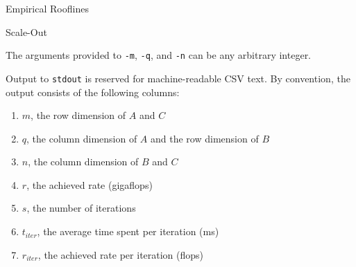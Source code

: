\documentclass{article}
\begin{document}
\begin{section}{Empirical Rooflines}
\begin{subsection}{Scale-Out}
    \begin{paragraph}{}
      The arguments provided to \texttt{-m}, \texttt{-q}, and \texttt{-n} can be any arbitrary integer.
    \end{paragraph}
    \begin{paragraph}{}
      Output to \texttt{stdout} is reserved for machine-readable CSV text. By convention, the output consists of the following columns:
      \begin{enumerate}
      \item{$m$, the row dimension of $A$ and $C$}
      \item{$q$, the column dimension of $A$ and the row dimension of $B$}
      \item{$n$, the column dimension of $B$ and $C$}
      \item{$r$, the achieved rate (gigaflops)}
      \item{$s$, the number of iterations}
      \item{$t_{iter}$, the average time spent per iteration (ms)}
      \item{$r_{iter}$, the achieved rate per iteration (flops)}
      \end{enumerate}
    \end{paragraph}
  \end{subsection}
\end{section}
\end{document}

